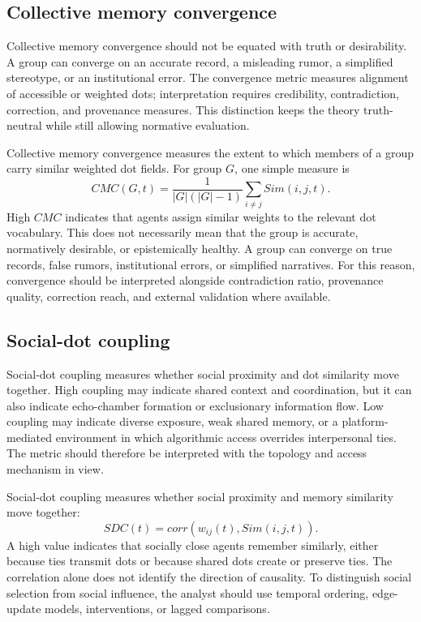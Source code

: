 \documentclass[11pt]{article}
\theoremstyle{remark}
\begin{document}
\subsection{Collective memory convergence}\label{collective-memory-convergence}

Collective memory convergence should not be equated with truth or desirability. A group can converge on an accurate record, a misleading rumor, a simplified stereotype, or an institutional error. The convergence metric measures alignment of accessible or weighted dots; interpretation requires credibility, contradiction, correction, and provenance measures. This distinction keeps the theory truth-neutral while still allowing normative evaluation.


Collective memory convergence measures the extent to which members of a group carry similar weighted dot fields. For group $G$, one simple measure is
\[
CMC(G,t)=\frac{1}{|G|(|G|-1)}\sum_{i\neq j}Sim(i,j,t).
\]
High $CMC$ indicates that agents assign similar weights to the relevant dot vocabulary. This does not necessarily mean that the group is accurate, normatively desirable, or epistemically healthy. A group can converge on true records, false rumors, institutional errors, or simplified narratives. For this reason, convergence should be interpreted alongside contradiction ratio, provenance quality, correction reach, and external validation where available.

\subsection{Social-dot coupling}\label{social-dot-coupling}

Social-dot coupling measures whether social proximity and dot similarity move together. High coupling may indicate shared context and coordination, but it can also indicate echo-chamber formation or exclusionary information flow. Low coupling may indicate diverse exposure, weak shared memory, or a platform-mediated environment in which algorithmic access overrides interpersonal ties. The metric should therefore be interpreted with the topology and access mechanism in view.


Social-dot coupling measures whether social proximity and memory similarity move together:
\[
SDC(t)=corr(w_{ij}(t),Sim(i,j,t)).
\]
A high value indicates that socially close agents remember similarly, either because ties transmit dots or because shared dots create or preserve ties. The correlation alone does not identify the direction of causality. To distinguish social selection from social influence, the analyst should use temporal ordering, edge-update models, interventions, or lagged comparisons.
\end{document}
